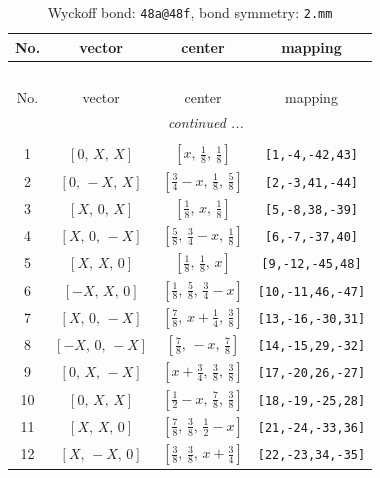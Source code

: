\documentclass[fleqn,8pt]{jsarticle}
\begin{document}
\begin{longtable}{cccc}
\caption{Wyckoff bond: {\tt 48a@48f}, bond symmetry: {\tt 2.mm}}
 \\
 \hline \hline
No. & vector & center & mapping \\ \hline \endfirsthead

\multicolumn{3}{l}{\tablename\ \thetable{}} \\
 \hline \hline
No. & vector & center & mapping \\ \hline \endhead

 \hline \hline
\multicolumn{3}{r}{\footnotesize\it continued ...} \\ \endfoot

 \hline \hline
\multicolumn{3}{r}{} \\ \endlastfoot

1 & $\left[ 0,\, X,\, X \right]$ & $\left[ x,\, \frac{1}{8},\, \frac{1}{8} \right]$ & {\tt [1,-4,-42,43]} \\ \hline
2 & $\left[ 0,\, - X,\, X \right]$ & $\left[ \frac{3}{4} - x,\, \frac{1}{8},\, \frac{5}{8} \right]$ & {\tt [2,-3,41,-44]} \\ \hline
3 & $\left[ X,\, 0,\, X \right]$ & $\left[ \frac{1}{8},\, x,\, \frac{1}{8} \right]$ & {\tt [5,-8,38,-39]} \\ \hline
4 & $\left[ X,\, 0,\, - X \right]$ & $\left[ \frac{5}{8},\, \frac{3}{4} - x,\, \frac{1}{8} \right]$ & {\tt [6,-7,-37,40]} \\ \hline
5 & $\left[ X,\, X,\, 0 \right]$ & $\left[ \frac{1}{8},\, \frac{1}{8},\, x \right]$ & {\tt [9,-12,-45,48]} \\ \hline
6 & $\left[ - X,\, X,\, 0 \right]$ & $\left[ \frac{1}{8},\, \frac{5}{8},\, \frac{3}{4} - x \right]$ & {\tt [10,-11,46,-47]} \\ \hline
7 & $\left[ X,\, 0,\, - X \right]$ & $\left[ \frac{7}{8},\, x + \frac{1}{4},\, \frac{3}{8} \right]$ & {\tt [13,-16,-30,31]} \\ \hline
8 & $\left[ - X,\, 0,\, - X \right]$ & $\left[ \frac{7}{8},\, - x,\, \frac{7}{8} \right]$ & {\tt [14,-15,29,-32]} \\ \hline
9 & $\left[ 0,\, X,\, - X \right]$ & $\left[ x + \frac{3}{4},\, \frac{3}{8},\, \frac{3}{8} \right]$ & {\tt [17,-20,26,-27]} \\ \hline
10 & $\left[ 0,\, X,\, X \right]$ & $\left[ \frac{1}{2} - x,\, \frac{7}{8},\, \frac{3}{8} \right]$ & {\tt [18,-19,-25,28]} \\ \hline
11 & $\left[ X,\, X,\, 0 \right]$ & $\left[ \frac{7}{8},\, \frac{3}{8},\, \frac{1}{2} - x \right]$ & {\tt [21,-24,-33,36]} \\ \hline
12 & $\left[ X,\, - X,\, 0 \right]$ & $\left[ \frac{3}{8},\, \frac{3}{8},\, x + \frac{3}{4} \right]$ & {\tt [22,-23,34,-35]} \\
\end{longtable}
\end{document}
